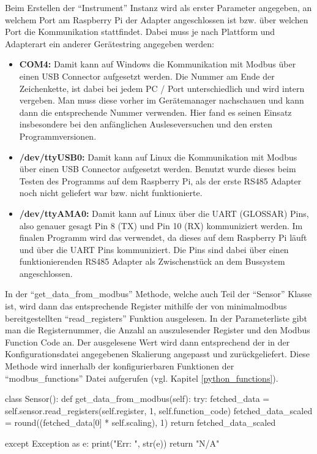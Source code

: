 Beim Erstellen der \enquote{Instrument} Instanz wird als erster Parameter angegeben, an welchem Port am Raspberry Pi der Adapter angeschlossen ist bzw. über welchen Port die Kommunikation stattfindet. Dabei muss je nach Plattform und Adapterart ein anderer Gerätestring angegeben werden:
\begin{itemize}
\item \textbf{COM4:} Damit kann auf Windows die Kommunikation mit Modbus über einen USB Connector aufgesetzt werden. Die Nummer am Ende der Zeichenkette, ist dabei bei jedem PC / Port unterschiedlich und wird intern vergeben. Man muss diese vorher im Gerätemanager nachschauen und kann dann die entsprechende Nummer verwenden. Hier fand es seinen Einsatz insbesondere bei den anfänglichen Ausleseversuchen und den ersten Programmversionen.
\item \textbf{/dev/ttyUSB0:} Damit kann auf Linux die Kommunikation mit Modbus über einen USB Connector aufgesetzt werden. Benutzt wurde dieses beim Testen des Programms auf dem Raspberry Pi, als der erste RS485 Adapter noch nicht geliefert war bzw. nicht funktionierte.
\item \textbf{/dev/ttyAMA0:} Damit kann auf Linux über die UART (GLOSSAR) Pins, also genauer gesagt Pin 8 (TX) und Pin 10 (RX) kommuniziert werden. Im finalen Programm wird das verwendet, da dieses auf dem Raspberry Pi läuft und über die UART Pins kommuniziert. Die Pins sind dabei über einen funktionierenden RS485 Adapter als Zwischenstück an dem Bussystem angeschlossen.
\end{itemize}

\vfill

\label{get_data_from_modbus}
In der \enquote{get\_data\_from\_modbus} Methode, welche auch Teil der \enquote{Sensor} Klasse ist, wird dann das entsprechende Register mithilfe der von minimalmodbus bereitgestellten \enquote{read\_registers} Funktion ausgelesen. In der Parameterliste gibt man die Registernummer, die Anzahl an auszulesender Register und den Modbus Function Code an. Der ausgelesene Wert wird dann entsprechend der in der Konfigurationsdatei angegebenen Skalierung angepasst und zurückgeliefert. Diese Methode wird innerhalb der konfigurierbaren Funktionen der \enquote{modbus\_functions} Datei aufgerufen (vgl. Kapitel \ref{python_functions}).

\begin{pythoncode}
class Sensor():
	def get_data_from_modbus(self):
		try:
			fetched_data = self.sensor.read_registers(self.register, 1, self.function_code)
			fetched_data_scaled = round((fetched_data[0] * self.scaling), 1)
			return fetched_data_scaled
		
		except Exception as e:
			print("Err: ", str(e))
			return "N/A"
\end{pythoncode}


